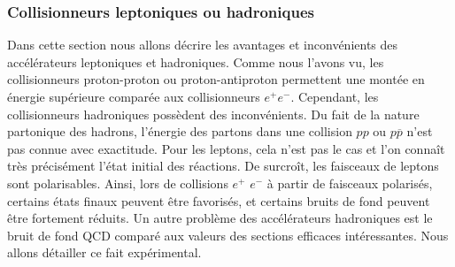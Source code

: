   \subsubsection{Collisionneurs leptoniques ou hadroniques}
   
   Dans cette section nous allons d\'ecrire les avantages et inconv\'enients des acc\'el\'erateurs leptoniques et hadroniques. Comme nous l'avons vu, les collisionneurs proton-proton ou proton-antiproton permettent une mont\'ee en \'energie sup\'erieure compar\'ee aux collisionneurs $e^+ e^-$. Cependant, les collisionneurs hadroniques poss\`edent des inconvénients. Du fait de la nature partonique des hadrons, l'énergie des partons dans une collision $pp$ ou $p\overline{p}$ n'est pas connue avec exactitude. Pour les leptons, cela n'est pas le cas et l'on connaît tr\`es pr\'ecis\'ement l'\'etat initial des r\'eactions. De surcro\^it, les faisceaux de leptons sont polarisables. Ainsi, lors de collisions $e^+$ $e^-$ \`a partir de faisceaux polaris\'es, certains \'etats finaux peuvent \^etre favoris\'es, et certains bruits de fond peuvent \^etre fortement r\'eduits. Un autre probl\`eme des acc\'el\'erateurs hadroniques est le bruit de fond QCD compar\'e aux valeurs des sections efficaces int\'eressantes. Nous allons d\'etailler ce fait exp\'erimental.
   
